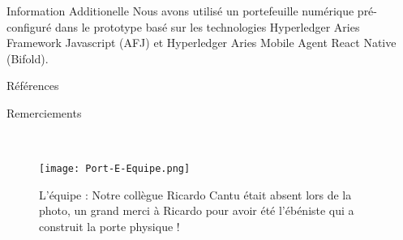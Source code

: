 \documentclass[final]{beamer}
\newlength{\onecolwid}
\begin{document}
\begin{frame}[t]
\begin{columns}[t]
\begin{column}{\onecolwid}
\begin{block}{Information Additionelle}
Nous avons utilisé un portefeuille numérique pré-configuré dans le prototype basé sur les technologies Hyperledger Aries Framework Javascript (AFJ) et Hyperledger Aries Mobile Agent React Native (Bifold).

\end{block}


\begin{block}{Références}

\nocite{*} %
\small{
\vspace{0.75in}}

\end{block}



\begin{block}{Remerciements}

\small{} \\

\begin{figure}
\texttt{[image: Port-E-Equipe.png]}
\caption{L'équipe : Notre collègue Ricardo Cantu était absent lors de la photo, un grand merci à Ricardo pour avoir été l'ébéniste qui a construit la porte physique !}
\end{figure}


\end{block}



\end{column}
\end{columns}
\end{frame}
\end{document}
